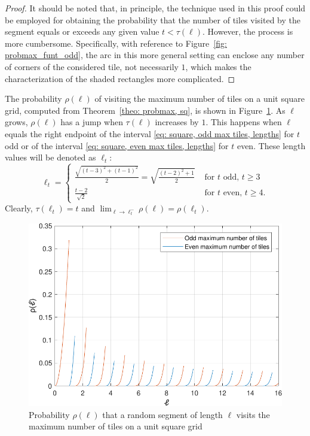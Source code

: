 \documentclass[12pt, a4paper]{article}
\newcommand{\funt}{\tau} %
\newcommand{\probmax}{\rho} %
\newcommand{\len}{\ell} %
\newcommand{\tiles}{t} %
\begin{document}
\begin{proof}
It should be noted that, in principle, the technique used in this proof could be employed for obtaining the probability that the number of tiles visited by the segment equals or exceeds any given value $\tiles < \funt(\len)$. However, the process is more cumbersome. Specifically, with reference to Figure~\ref{fig: probmax_funt_odd}, the arc in this more general setting can enclose any number of corners of the considered tile, not necessarily $1$, which makes the characterization of the shaded rectangles more complicated.
\end{proof}

The probability $\probmax(\len)$ of visiting the maximum number of tiles on a unit square grid, computed from Theorem~\ref{theo: probmax, sq}, is shown in Figure~\ref{fig: probmax_len}. As $\len$ grows, $\probmax(\len)$ has a jump when $\funt(\len)$ increases by $1$. This happens when $\len$ equals the right endpoint of the interval \eqref{eq: square, odd max tiles, lengths} for $\tiles$ odd or of the interval \eqref{eq: square, even max tiles, lengths} for $\tiles$ even. These length values will be denoted as $\len_\tiles$:
\begin{equation}
\label{eq: len tiles}
\len_\tiles = \begin{cases}
\displaystyle
\frac{\sqrt{(\tiles-3)^2 + (\tiles-1)^2}} {2} = \sqrt{\frac{(\tiles-2)^2+1}{2}} & \text{ for $\tiles$ odd, $\tiles \geq 3$} \\[2 mm] %
\displaystyle
\frac{\tiles-2}{\sqrt{2}} & \text{ for $\tiles$ even, $\tiles \geq 4$}.
\end{cases}
\end{equation}
Clearly, $\funt(\len_\tiles) = \tiles$ and $\lim_{\len \rightarrow \len_\tiles^- } \probmax(\len) = \probmax(\len_\tiles)$.

\begin{figure}%
\centering%
\includegraphics[width=.74\textwidth]{probmax_len}%
\caption{Probability $\probmax(\len)$ that a random segment of length $\len$ visits the maximum number of tiles on a unit square grid%
}%
\label{fig: probmax_len}%
\end{figure}%
\end{document}
